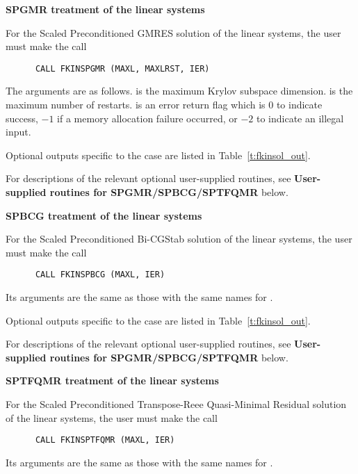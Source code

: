 \begin{Steps}
  
  {\s}{\p} {\bf SPGMR treatment of the linear systems}

  For the Scaled Preconditioned GMRES solution of the linear systems,
  the user must make the call
\begin{verbatim}
      CALL FKINSPGMR (MAXL, MAXLRST, IER)
\end{verbatim}
  The arguments are as follows.
   is the maximum Krylov subspace dimension.
   is the maximum number of restarts.
   is an error return flag which is $0$ to indicate success, $-1$
  if a memory allocation failure occurred, or $-2$ to indicate an illegal input.
  
  Optional outputs specific to the {\spgmr} case are listed in
  Table~\ref{t:fkinsol_out}.

  For descriptions of the relevant optional user-supplied routines, see 
  {\bf User-supplied routines for SPGMR/SPBCG/SPTFQMR} below.
  
  
  {\s}{\p} {\bf SPBCG treatment of the linear systems}
  
  For the Scaled Preconditioned Bi-CGStab solution of the linear systems,
  the user must make the call
\begin{verbatim}
      CALL FKINSPBCG (MAXL, IER)
\end{verbatim}
  Its arguments are the same as those with the same names for .

  Optional outputs specific to the {\spbcg} case are listed in
  Table~\ref{t:fkinsol_out}.

  For descriptions of the relevant optional user-supplied routines, see 
  {\bf User-supplied routines for SPGMR/SPBCG/SPTFQMR} below.
  
  
  {\s}{\p} {\bf SPTFQMR treatment of the linear systems}
  
  For the Scaled Preconditioned Transpose-Reee Quasi-Minimal Residual solution 
  of the linear systems, the user must make the call
\begin{verbatim}
      CALL FKINSPTFQMR (MAXL, IER)
\end{verbatim}
  Its arguments are the same as those with the same names for .


\end{Steps}
